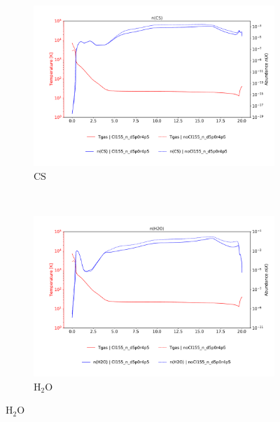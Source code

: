 \begin{figure}[!htbp]
    \centering
    \begin{subfigure}[t]{0.45\textwidth} %
        \centering \includegraphics[trim = {0 0 0 1.5cm},clip,width=1\textwidth]{figure/Cl/gridModelEmiss/nT_comp_CS.pdf}
        \caption{$\mathrm{CS}$}
    \end{subfigure}
    ~ 
   \begin{subfigure}[t]{0.45\textwidth} %
        \centering \includegraphics[trim = {0 0 0 1.5cm},clip,width=1\textwidth]{figure/Cl/gridModelEmiss/nT_comp_H2O.pdf}
        \caption{$\mathrm{H}_2\mathrm{O}$}
    \end{subfigure}
    

\end{figure}
